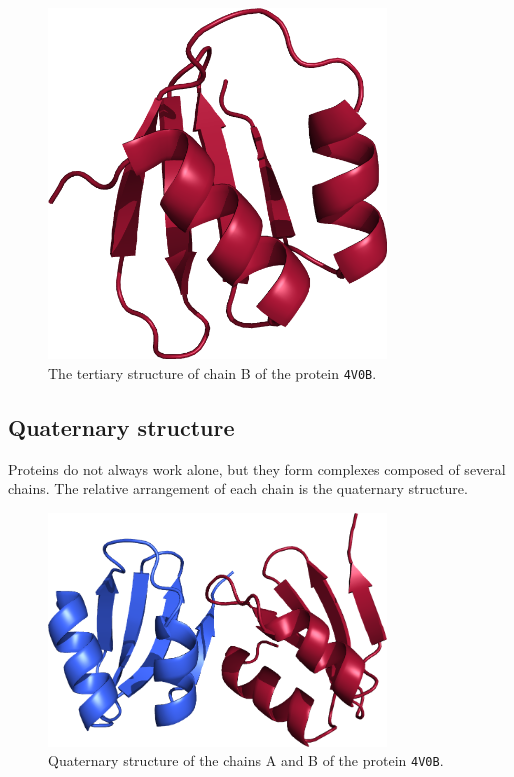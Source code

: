 \begin{figure}[htb]
\centering
\includegraphics[width=0.8\textwidth]{bioinfo/figures/tertiary}
\caption{The tertiary structure of chain B of the protein \texttt{4V0B}.}\label{fig:tertiary}
\end{figure}

\subsection{Quaternary structure}
Proteins do not always work alone, but they form complexes composed of several chains.
The relative arrangement of each chain is the quaternary structure.

\begin{figure}[htb]
\centering
\includegraphics[width=0.8\textwidth]{bioinfo/figures/quaternary}
\caption{Quaternary structure of the chains A and B of the protein \texttt{4V0B}.}\label{fig:quaternary}
\end{figure}

